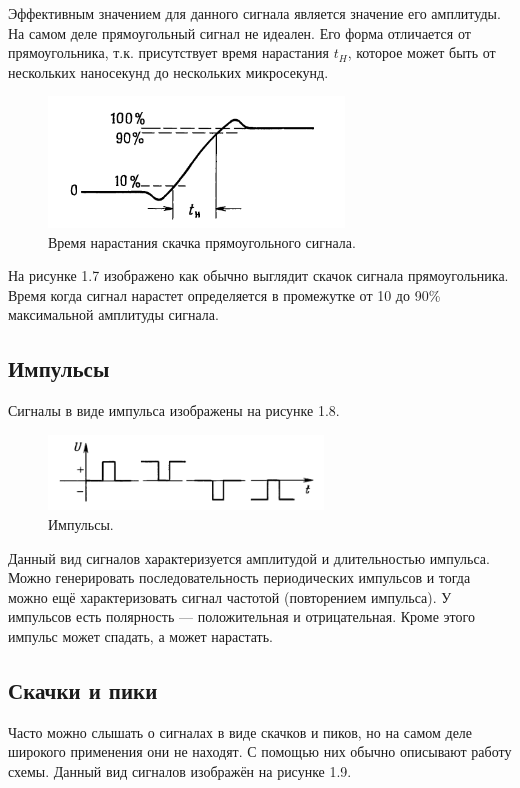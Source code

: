 	Эффективным значением для данного сигнала является значение его амплитуды. На самом деле прямоугольный сигнал не идеален. Его форма отличается от прямоугольника, т.к. присутствует время нарастания $t_{H}$, которое может быть от нескольких наносекунд до нескольких микросекунд.

	\begin{figure}[H]
    \centering
    \includegraphics[width=0.7\textwidth]{../image/s_p_t.png}
    \caption{Время нарастания скачка прямоугольного сигнала.}
	\end{figure}
	
	На рисунке 1.7 изображено как обычно выглядит скачок сигнала прямоугольника. Время когда сигнал нарастет определяется в промежутке от 10 до 90\% максимальной амплитуды сигнала.

\subsection{Импульсы}
Сигналы в виде импульса изображены на рисунке 1.8.

	\begin{figure}[H]
    \centering
    \includegraphics[width=0.65\textwidth]{../image/s_i.png}
    \caption{Импульсы.}
	\end{figure}
	
	Данный вид сигналов характеризуется амплитудой и длительностью импульса. Можно генерировать последовательность периодических импульсов и тогда можно ещё характеризовать сигнал частотой (повторением импульса). У импульсов есть полярность --- положительная и отрицательная. Кроме этого импульс может спадать, а может нарастать. 
	


\subsection{Скачки и пики}
	Часто можно слышать о сигналах в виде скачков и пиков, но на самом деле широкого применения они не находят. С помощью них обычно описывают работу схемы. Данный вид сигналов изображён на рисунке 1.9.

